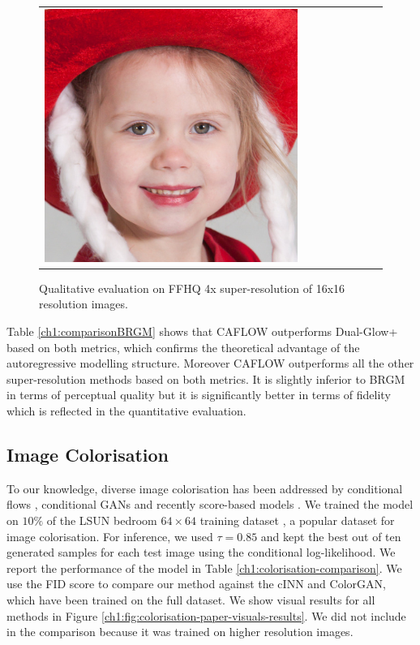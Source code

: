 \begin{figure}[h!]
\begin{center}
\begin{tabular}{cccccccc}
        \includegraphics[width=0.12\linewidth]{Chapter1/paper_graphs/super_resolution/TRUE.jpg} \\
    \end{tabular}
    \end{center}
    \caption{Qualitative evaluation on FFHQ 4x super-resolution of 16x16 resolution images.}\label{ch1:SR-visuals-paper}
    \end{figure}
    
    Table \ref{ch1:comparisonBRGM} shows that CAFLOW outperforms Dual-Glow+ based on both metrics, which confirms the theoretical advantage of the autoregressive modelling structure. Moreover CAFLOW outperforms all the other super-resolution methods based on both metrics. It is slightly inferior to BRGM \cite{BRGM} in terms of perceptual quality but it is significantly better in terms of fidelity which is reflected in the quantitative evaluation.


\subsection{Image Colorisation}
    To our knowledge, diverse image colorisation has been addressed by conditional flows \cite{ardizzone2019guided}, conditional GANs \cite{colorGAN} and recently score-based models \cite{scorebased}. 
    We trained the model on $10\%$ of the LSUN bedroom $64\times 64$ training dataset \cite{yu2015lsun},  a popular dataset for image colorisation. For inference, we used $\tau=0.85$ and kept the best out of ten generated samples for each test image using the conditional log-likelihood. We report the performance of the model in Table \ref{ch1:colorisation-comparison}. We use the FID score to compare our method against the cINN and ColorGAN, which have been trained on the full dataset. We show visual results for all methods in Figure \ref{ch1:fig:colorisation-paper-visuals-results}. 
    We did not include \cite{scorebased} in the comparison because it was trained on higher resolution images.

